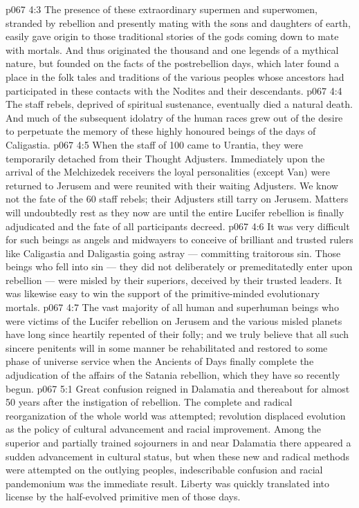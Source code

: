 \vs p067 4:3 The presence of these extraordinary supermen and superwomen, stranded by rebellion and presently mating with the sons and daughters of earth, easily gave origin to those traditional stories of the gods coming down to mate with mortals. And thus originated the thousand and one legends of a mythical nature, but founded on the facts of the postrebellion days, which later found a place in the folk tales and traditions of the various peoples whose ancestors had participated in these contacts with the Nodites and their descendants.
\vs p067 4:4 The staff rebels, deprived of spiritual sustenance, eventually died a natural death. And much of the subsequent idolatry of the human races grew out of the desire to perpetuate the memory of these highly honoured beings of the days of Caligastia.
\vs p067 4:5 When the staff of 100 came to Urantia, they were temporarily detached from their Thought Adjusters. Immediately upon the arrival of the Melchizedek receivers the loyal personalities (except Van) were returned to Jerusem and were reunited with their waiting Adjusters. We know not the fate of the 60 staff rebels; their Adjusters still tarry on Jerusem. Matters will undoubtedly rest as they now are until the entire Lucifer rebellion is finally adjudicated and the fate of all participants decreed.
\vs p067 4:6 \pc It was very difficult for such beings as angels and midwayers to conceive of brilliant and trusted rulers like Caligastia and Daligastia going astray --- committing traitorous sin. Those beings who fell into sin --- they did not deliberately or premeditatedly enter upon rebellion --- were misled by their superiors, deceived by their trusted leaders. It was likewise easy to win the support of the primitive\hyp{}minded evolutionary mortals.
\vs p067 4:7 The vast majority of all human and superhuman beings who were victims of the Lucifer rebellion on Jerusem and the various misled planets have long since heartily repented of their folly; and we truly believe that all such sincere penitents will in some manner be rehabilitated and restored to some phase of universe service when the Ancients of Days finally complete the adjudication of the affairs of the Satania rebellion, which they have so recently begun.
\vs p067 5:1 Great confusion reigned in Dalamatia and thereabout for almost 50 years after the instigation of rebellion. The complete and radical reorganization of the whole world was attempted; revolution displaced evolution as the policy of cultural advancement and racial improvement. Among the superior and partially trained sojourners in and near Dalamatia there appeared a sudden advancement in cultural status, but when these new and radical methods were attempted on the outlying peoples, indescribable confusion and racial pandemonium was the immediate result. Liberty was quickly translated into license by the half\hyp{}evolved primitive men of those days.
